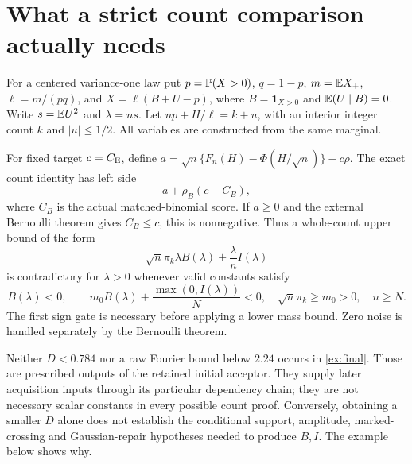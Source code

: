 \section{What a strict count comparison actually needs}
For a centered variance-one law put $p=\mathbb P(X>0)$, $q=1-p$,
$m=\mathbb E X_+$, $\ell=m/(pq)$, and
$X=\ell(B+U-p)$, where $B=\mathbf1_{X>0}$ and
$\mathbb E(U\mid B)=0$. Write $s=\mathbb E U^2$ and $\lambda=ns$.
Let $np+H/\ell=k+u$, with an interior integer count $k$ and
$|u|\le1/2$. All variables are constructed from the same marginal.

For fixed target $c=C_{\mathrm E}$, define
$a=\sqrt n\{F_n(H)-\Phi(H/\sqrt n)\}-c\rho$.
The exact count identity has left side
\[
                     a+\rho_B(c-C_B),
\]
where $C_B$ is the actual matched-binomial score. If $a\ge0$ and
the external Bernoulli theorem gives $C_B\le c$, this is nonnegative.
Thus a whole-count upper bound of the form
\[
 \sqrt n\pi_k\lambda B(\lambda)+\frac{\lambda}{n}I(\lambda)
\]
is contradictory for $\lambda>0$ whenever valid constants satisfy
\begin{equation}\label{ex:final}
 B(\lambda)<0,\qquad
 m_0B(\lambda)+\frac{\max(0,I(\lambda))}{N}<0,
 \quad \sqrt n\pi_k\ge m_0>0,
 \quad n\ge N.
\end{equation}
The first sign gate is necessary before applying a lower mass bound.
Zero noise is handled separately by the Bernoulli theorem.

Neither $D<0.784$ nor a raw Fourier bound below $2.24$ occurs in
\eqref{ex:final}. Those are prescribed outputs of the retained initial
acceptor. They supply later acquisition inputs through its particular
dependency chain; they are not necessary scalar constants in every possible
count proof. Conversely, obtaining a smaller $D$ alone does not establish
the conditional support, amplitude, marked-crossing and Gaussian-repair
hypotheses needed to produce $B,I$. The example below shows why.

